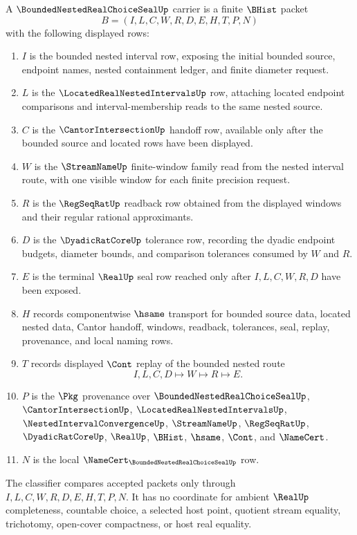 \begin{definition}
\label{def:bounded-nested-real-choice-seal-carrier}
A $\BoundedNestedRealChoiceSealUp$ carrier is a finite $\BHist$ packet
$$
B=(I,L,C,W,R,D,E,H,T,P,N)
$$
with the following displayed rows:
\begin{enumerate}
\item $I$ is the bounded nested interval row, exposing the initial bounded source, endpoint names, nested containment ledger, and finite diameter request.
\item $L$ is the $\LocatedRealNestedIntervalsUp$ row, attaching located endpoint comparisons and interval-membership reads to the same nested source.
\item $C$ is the $\CantorIntersectionUp$ handoff row, available only after the bounded source and located rows have been displayed.
\item $W$ is the $\StreamNameUp$ finite-window family read from the nested interval route, with one visible window for each finite precision request.
\item $R$ is the $\RegSeqRatUp$ readback row obtained from the displayed windows and their regular rational approximants.
\item $D$ is the $\DyadicRatCoreUp$ tolerance row, recording the dyadic endpoint budgets, diameter bounds, and comparison tolerances consumed by $W$ and $R$.
\item $E$ is the terminal $\RealUp$ seal row reached only after $I,L,C,W,R,D$ have been exposed.
\item $H$ records componentwise $\hsame$ transport for bounded source data, located nested data, Cantor handoff, windows, readback, tolerances, seal, replay, provenance, and local naming rows.
\item $T$ records displayed $\Cont$ replay of the bounded nested route
$$
I,L,C,D \longmapsto W \longmapsto R \longmapsto E .
$$
\item $P$ is the $\Pkg$ provenance over $\BoundedNestedRealChoiceSealUp$, $\CantorIntersectionUp$, $\LocatedRealNestedIntervalsUp$, $\NestedIntervalConvergenceUp$, $\StreamNameUp$, $\RegSeqRatUp$, $\DyadicRatCoreUp$, $\RealUp$, $\BHist$, $\hsame$, $\Cont$, and $\NameCert$.
\item $N$ is the local $\NameCert_{\BoundedNestedRealChoiceSealUp}$ row.
\end{enumerate}
The classifier compares accepted packets only through $I,L,C,W,R,D,E,H,T,P,N$. It has no coordinate for ambient $\RealUp$ completeness, countable choice, a selected host point, quotient stream equality, trichotomy, open-cover compactness, or host real equality.
\end{definition}

